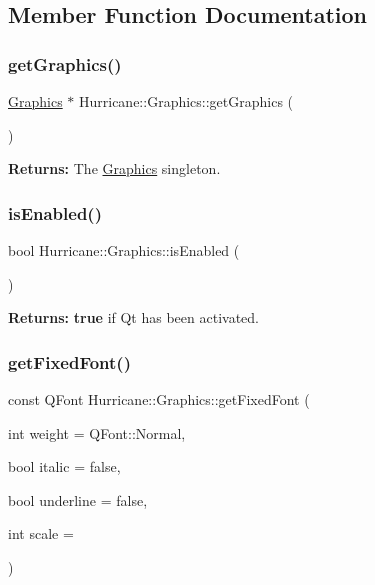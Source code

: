 \subsection{Member Function Documentation}
\mbox{\label{classHurricane_1_1Graphics_a4f8d6eaeef8d9ae781be929e95545f0c}} 
\subsubsection{\texorpdfstring{get\+Graphics()}{getGraphics()}}
{\footnotesize\ttfamily \mbox{\hyperlink{classHurricane_1_1Graphics}{Graphics}} $\ast$ Hurricane\+::\+Graphics\+::get\+Graphics (\begin{DoxyParamCaption}{ }\end{DoxyParamCaption})\hspace{0.3cm}{\ttfamily [static]}}

{\bfseries Returns\+:} The \mbox{\hyperlink{classHurricane_1_1Graphics}{Graphics}} singleton. \mbox{\label{classHurricane_1_1Graphics_a02964067103bdd4c27bbf4af91a47cf8}} 
\subsubsection{\texorpdfstring{is\+Enabled()}{isEnabled()}}
{\footnotesize\ttfamily bool Hurricane\+::\+Graphics\+::is\+Enabled (\begin{DoxyParamCaption}{ }\end{DoxyParamCaption})\hspace{0.3cm}{\ttfamily [static]}}

{\bfseries Returns\+:} {\bfseries true} if Qt has been activated. \mbox{\label{classHurricane_1_1Graphics_a30322de9fd4a042d8773465c622a1650}} 
\subsubsection{\texorpdfstring{get\+Fixed\+Font()}{getFixedFont()}}
{\footnotesize\ttfamily const Q\+Font Hurricane\+::\+Graphics\+::get\+Fixed\+Font (\begin{DoxyParamCaption}\item[{int}]{weight = {\ttfamily QFont\+:\+:Normal},  }\item[{bool}]{italic = {\ttfamily false},  }\item[{bool}]{underline = {\ttfamily false},  }\item[{int}]{scale = {} }\end{DoxyParamCaption})\hspace{0.3cm}{\ttfamily [static]}}


